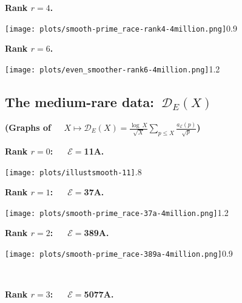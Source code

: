 \documentclass[11pt]{article}
\theoremstyle{plain}
\theoremstyle{definition}
\numberwithin{equation}{section}
\numberwithin{figure}{section}
\numberwithin{table}{section}
\begin{document}
  \centerline{\bf Rank $r=4$.}


  \vskip20pt


     \texttt{[image: plots/smooth-prime\_race-rank4-4million.png]}{0.9}~\label{sr4}

 \vskip40pt






 \newpage

  \centerline{\bf Rank $r=6$.}


 \vskip20pt



     \texttt{[image: plots/even\_smoother-rank6-4million.png]}{1.2}~\label{sr6}
         \subsection{The medium-rare data:\   ${\mathcal D}_E(X)$}
       \vskip40pt

       \centerline{\bf (Graphs of \ \   $X\mapsto {\mathcal D}_E(X) = {\frac{\log\ X}{\sqrt X}}\sum_{p \le X}{\frac{a_{\mathcal E}(p)}{\sqrt p}}$)}

 \vskip40pt


  \centerline{\bf Rank $r=0$:\ \ \  ${\mathcal E}=$11A.}
   \vskip20pt
   \texttt{[image: plots/illustsmooth-11]}{.8}~\label{s11}
  \

    \newpage

  \centerline{\bf Rank $r=1$:\ \ \  ${\mathcal E}=$37A.}


   \vskip40pt



     \texttt{[image: plots/smooth-prime\_race-37a-4million.png]}{1.2}~\label{s37}
%

   \vskip40pt


  \centerline{\bf Rank $r=2$:\ \ \  ${\mathcal E}=$389A.}


  \vskip20pt


     \texttt{[image: plots/smooth-prime\_race-389a-4million.png]}{0.9}~\label{s389}


\newpage

\
  \centerline{\bf Rank $r=3$:\ \ \  ${\mathcal E}=$5077A.}


 \vskip10pt
\end{document}
